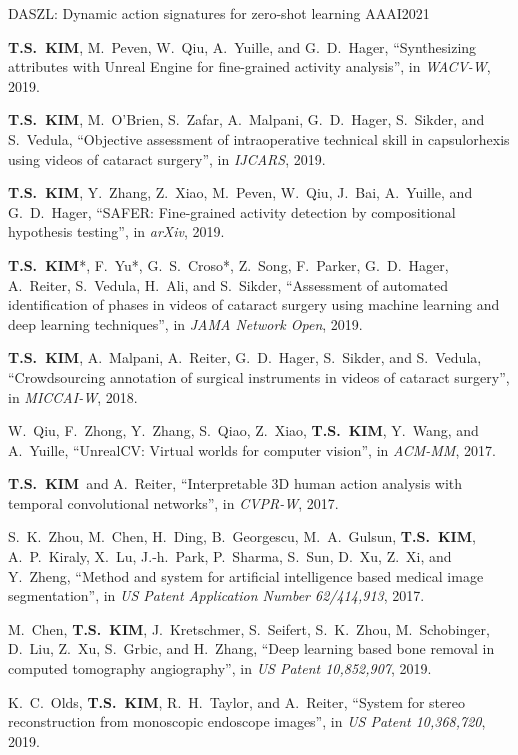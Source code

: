 \documentclass[11pt,letterpaper]{article}
\newcommand{\me}{\textbf{T.S.~KIM}}
\newcommand{\pub}[5]{\item\label{pub:#1}#2, ``#3'', in \textit{#4}, #5.}
\begin{document}
\begin{publications}
      {DASZL: Dynamic action signatures for zero-shot learning}
      {AAAI}{2021}
  \pub{synthesizing-attributes}
      {\me, M.~Peven, W.~Qiu, A.~Yuille, and G.~D.~Hager}
      {Synthesizing attributes with Unreal Engine for fine-grained activity analysis}
      {WACV-W}{2019}
  \pub{capsulorhexis}
      {\me, M.~O'Brien, S.~Zafar, A.~Malpani, G.~D.~Hager, S.~Sikder, and S.~Vedula}
      {Objective assessment of intraoperative technical skill in capsulorhexis using videos of cataract surgery}
      {IJCARS}{2019}
  \pub{safer}
      {\me, Y.~Zhang, Z.~Xiao, M.~Peven, W.~Qiu, J.~Bai, A.~Yuille, and G.~D.~Hager}
      {SAFER: Fine-grained activity detection by compositional hypothesis testing}
      {arXiv}{2019}
  \pub{cataract-phases}
      {\me*, F.~Yu*, G.~S.~Croso*, Z.~Song, F.~Parker, G.~D.~Hager, A.~Reiter, S.~Vedula, H.~Ali, and S.~Sikder}
      {Assessment of automated identification of phases in videos of cataract surgery using machine learning and deep learning techniques}
      {JAMA Network Open}{2019}
  \pub{crowdsourcing}
      {\me, A.~Malpani, A.~Reiter, G.~D.~Hager, S.~Sikder, and S.~Vedula}
      {Crowdsourcing annotation of surgical instruments in videos of cataract surgery}
      {MICCAI-W}{2018}
  \pub{unrealcv}
      {W.~Qiu, F.~Zhong, Y.~Zhang, S.~Qiao, Z.~Xiao, \me, Y.~Wang, and A.~Yuille}
      {UnrealCV: Virtual worlds for computer vision}
      {ACM-MM}{2017}
  \pub{tcn}
      {\me\ and A.~Reiter}
      {Interpretable 3D human action analysis with temporal convolutional networks}
      {CVPR-W}{2017}
  \pub{patent-segmentation}
      {S.~K.~Zhou, M.~Chen, H.~Ding, B.~Georgescu, M.~A.~Gulsun, \me, A.~P.~Kiraly, X.~Lu, J.-h.~Park, P.~Sharma, S.~Sun, D.~Xu, Z.~Xi, and Y.~Zheng}
      {Method and system for artificial intelligence based medical image segmentation}
      {US Patent Application Number 62/414,913}{2017}
  \pub{patent-bone-removal}
      {M.~Chen, \me, J.~Kretschmer, S.~Seifert, S.~K.~Zhou, M.~Schobinger, D.~Liu, Z.~Xu, S.~Grbic, and H.~Zhang}
      {Deep learning based bone removal in computed tomography angiography}
      {US Patent 10,852,907}{2019}
  \pub{patent-endoscope}
      {K.~C.~Olds, \me, R.~H.~Taylor, and A.~Reiter}
      {System for stereo reconstruction from monoscopic endoscope images}
      {US Patent 10,368,720}{2019}
\end{publications}
\end{document}
